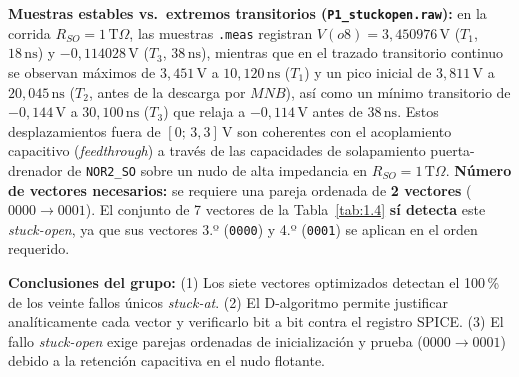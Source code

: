 \documentclass[10pt,a4paper]{article}
\begin{document}
\textbf{Muestras estables vs.\ extremos transitorios (\texttt{P1\_stuckopen.raw}):} en la corrida $R_{SO}=1\,\mathrm{T}\Omega$, las muestras \texttt{.meas} registran $V(o8)=3{,}450976\,\mathrm{V}$ ($T_1$, $18\,\mathrm{ns}$) y $-0{,}114028\,\mathrm{V}$ ($T_3$, $38\,\mathrm{ns}$), mientras que en el trazado transitorio continuo se observan máximos de $3{,}451\,\mathrm{V}$ a $10{,}120\,\mathrm{ns}$ ($T_1$) y un pico inicial de $3{,}811\,\mathrm{V}$ a $20{,}045\,\mathrm{ns}$ ($T_2$, antes de la descarga por $MNB$), así como un mínimo transitorio de $-0{,}144\,\mathrm{V}$ a $30{,}100\,\mathrm{ns}$ ($T_3$) que relaja a $-0{,}114\,\mathrm{V}$ antes de $38\,\mathrm{ns}$. Estos desplazamientos fuera de $[0;\,3{,}3]\,\mathrm{V}$ son coherentes con el acoplamiento capacitivo (\emph{feedthrough}) a través de las capacidades de solapamiento puerta-drenador de \texttt{NOR2\_SO} sobre un nudo de alta impedancia en $R_{SO}=1\,\mathrm{T}\Omega$. \textbf{Número de vectores necesarios:} se requiere una pareja ordenada de \textbf{2 vectores} ($0000 \to 0001$). El conjunto de 7 vectores de la Tabla~\ref{tab:1.4} \textbf{sí detecta} este \emph{stuck-open}, ya que sus vectores 3.º (\texttt{0000}) y 4.º (\texttt{0001}) se aplican en el orden requerido.

\textbf{Conclusiones del grupo:} (1) Los siete vectores optimizados detectan el 100\,\% de los veinte fallos únicos \emph{stuck-at}. (2) El D-algoritmo permite justificar analíticamente cada vector y verificarlo bit a bit contra el registro SPICE. (3) El fallo \emph{stuck-open} exige parejas ordenadas de inicialización y prueba ($0000 \to 0001$) debido a la retención capacitiva en el nudo flotante.
\end{document}
